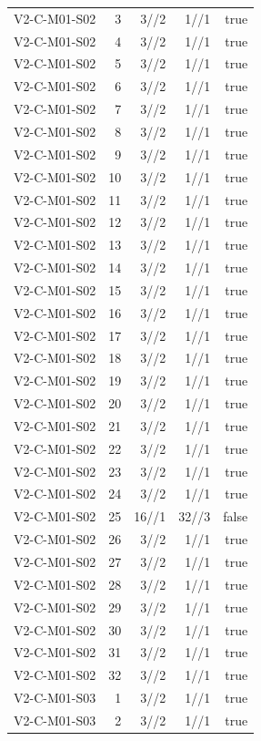 {\begin{longtable}{lrrrr}
V2-C-M01-S02 & 3 & 3//2 & 1//1 & true \\
V2-C-M01-S02 & 4 & 3//2 & 1//1 & true \\
V2-C-M01-S02 & 5 & 3//2 & 1//1 & true \\
V2-C-M01-S02 & 6 & 3//2 & 1//1 & true \\
V2-C-M01-S02 & 7 & 3//2 & 1//1 & true \\
V2-C-M01-S02 & 8 & 3//2 & 1//1 & true \\
V2-C-M01-S02 & 9 & 3//2 & 1//1 & true \\
V2-C-M01-S02 & 10 & 3//2 & 1//1 & true \\
V2-C-M01-S02 & 11 & 3//2 & 1//1 & true \\
V2-C-M01-S02 & 12 & 3//2 & 1//1 & true \\
V2-C-M01-S02 & 13 & 3//2 & 1//1 & true \\
V2-C-M01-S02 & 14 & 3//2 & 1//1 & true \\
V2-C-M01-S02 & 15 & 3//2 & 1//1 & true \\
V2-C-M01-S02 & 16 & 3//2 & 1//1 & true \\
V2-C-M01-S02 & 17 & 3//2 & 1//1 & true \\
V2-C-M01-S02 & 18 & 3//2 & 1//1 & true \\
V2-C-M01-S02 & 19 & 3//2 & 1//1 & true \\
V2-C-M01-S02 & 20 & 3//2 & 1//1 & true \\
V2-C-M01-S02 & 21 & 3//2 & 1//1 & true \\
V2-C-M01-S02 & 22 & 3//2 & 1//1 & true \\
V2-C-M01-S02 & 23 & 3//2 & 1//1 & true \\
V2-C-M01-S02 & 24 & 3//2 & 1//1 & true \\
V2-C-M01-S02 & 25 & 16//1 & 32//3 & false \\
V2-C-M01-S02 & 26 & 3//2 & 1//1 & true \\
V2-C-M01-S02 & 27 & 3//2 & 1//1 & true \\
V2-C-M01-S02 & 28 & 3//2 & 1//1 & true \\
V2-C-M01-S02 & 29 & 3//2 & 1//1 & true \\
V2-C-M01-S02 & 30 & 3//2 & 1//1 & true \\
V2-C-M01-S02 & 31 & 3//2 & 1//1 & true \\
V2-C-M01-S02 & 32 & 3//2 & 1//1 & true \\
V2-C-M01-S03 & 1 & 3//2 & 1//1 & true \\
V2-C-M01-S03 & 2 & 3//2 & 1//1 & true \\

\end{longtable}}
